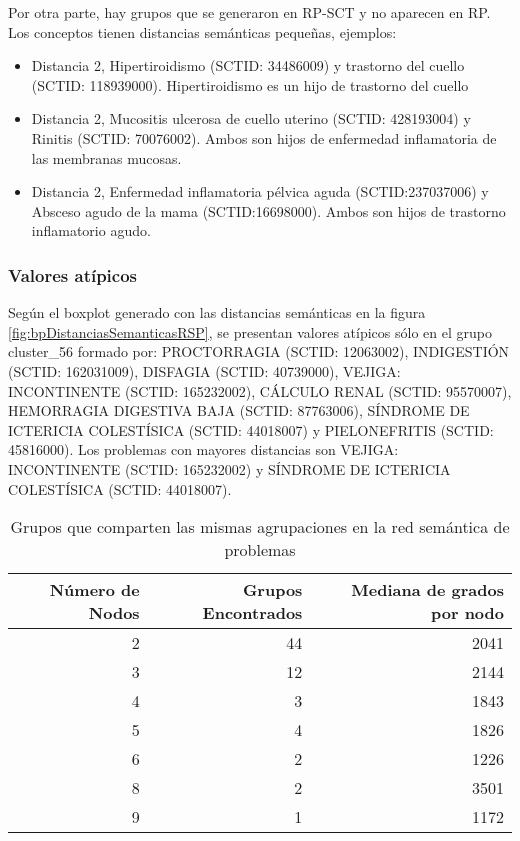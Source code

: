 Por otra parte, hay grupos que se generaron en \acrshort{RP-SCT} y no aparecen en  \acrshort{RP}.  Los conceptos tienen distancias semánticas pequeñas,  ejemplos:
\begin{itemize}
\item Distancia 2, Hipertiroidismo (SCTID:  34486009) y trastorno del cuello (SCTID: 118939000).  Hipertiroidismo es un hijo de trastorno del cuello
\item Distancia 2, Mucositis ulcerosa de cuello uterino (SCTID: 428193004) y Rinitis (SCTID:  70076002). Ambos son hijos de enfermedad inflamatoria de las membranas mucosas.
\item Distancia 2, Enfermedad inflamatoria pélvica aguda  (SCTID:237037006) y Absceso agudo de la mama  (SCTID:16698000). Ambos son hijos de trastorno inflamatorio agudo.
\end{itemize}


\subsubsection{Valores atípicos}
Según el boxplot generado con las distancias semánticas en la figura \ref{fig:bpDistanciasSemanticasRSP}, se presentan valores atípicos sólo en el grupo cluster\_56 formado por: PROCTORRAGIA (SCTID: 12063002), INDIGESTIÓN (SCTID: 162031009), DISFAGIA (SCTID: 40739000), VEJIGA: INCONTINENTE (SCTID: 165232002), CÁLCULO RENAL (SCTID: 95570007), HEMORRAGIA DIGESTIVA BAJA (SCTID: 87763006), SÍNDROME DE ICTERICIA COLESTÍSICA (SCTID: 44018007) y PIELONEFRITIS (SCTID: 45816000). Los problemas con mayores distancias son VEJIGA: INCONTINENTE (SCTID: 165232002) y SÍNDROME DE ICTERICIA COLESTÍSICA (SCTID: 44018007).


\begin{table}[htb]
\centering
\caption{Grupos que comparten las mismas agrupaciones en la red semántica de problemas}
\label{gruposRSP}
\begin{tabular}{@{}rrr@{}}
\toprule
Número de Nodos & Grupos Encontrados & Mediana de grados por nodo \\ \midrule
2	& 44	&2041 \\
3	&12 &	2144\\
4	&3&	1843\\
5	&4&	1826\\
6	&2&	1226\\
8	&2&	3501\\
9	&1&	1172                   \\ \bottomrule
\end{tabular}
\end{table}

